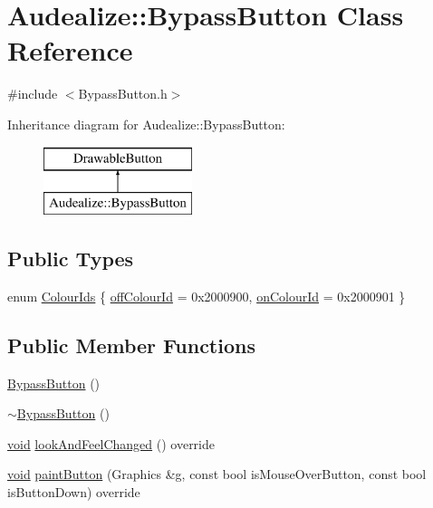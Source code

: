 \hypertarget{class_audealize_1_1_bypass_button}{}\section{Audealize\+:\+:Bypass\+Button Class Reference}
\label{class_audealize_1_1_bypass_button}


{\ttfamily \#include $<$Bypass\+Button.\+h$>$}

Inheritance diagram for Audealize\+:\+:Bypass\+Button\+:\begin{figure}[H]
\begin{center}
\leavevmode
\includegraphics[height=2.000000cm]{class_audealize_1_1_bypass_button}
\end{center}
\end{figure}
\subsection*{Public Types}
\begin{DoxyCompactItemize}
\item 
enum \hyperlink{class_audealize_1_1_bypass_button_a82be721eb2e882505c0e1c47e7f23a04}{Colour\+Ids} \{ \hyperlink{class_audealize_1_1_bypass_button_a82be721eb2e882505c0e1c47e7f23a04a3d3a64c3628718fc55324463d34049da}{off\+Colour\+Id} = 0x2000900, 
\hyperlink{class_audealize_1_1_bypass_button_a82be721eb2e882505c0e1c47e7f23a04a1ec53dd2ba394a9eb1c9f7fea87b2e9c}{on\+Colour\+Id} = 0x2000901
 \}
\end{DoxyCompactItemize}
\subsection*{Public Member Functions}
\begin{DoxyCompactItemize}
\item 
\hyperlink{class_audealize_1_1_bypass_button_acd4cf48194a2537bd05691f586eae9b9}{Bypass\+Button} ()
\item 
\hyperlink{class_audealize_1_1_bypass_button_a1f07bc84de772d603aab713987049d16}{$\sim$\+Bypass\+Button} ()
\item 
\hyperlink{tk_8h_aba408b7cd755a96426e004c015f5de8e}{void} \hyperlink{class_audealize_1_1_bypass_button_adda4dc38f9cebc36bf8fda5563ee2768}{look\+And\+Feel\+Changed} () override
\item 
\hyperlink{tk_8h_aba408b7cd755a96426e004c015f5de8e}{void} \hyperlink{class_audealize_1_1_bypass_button_af3af03dfd3c4773e82943f85101b004b}{paint\+Button} (Graphics \&g, const bool is\+Mouse\+Over\+Button, const bool is\+Button\+Down) override
\end{DoxyCompactItemize}


